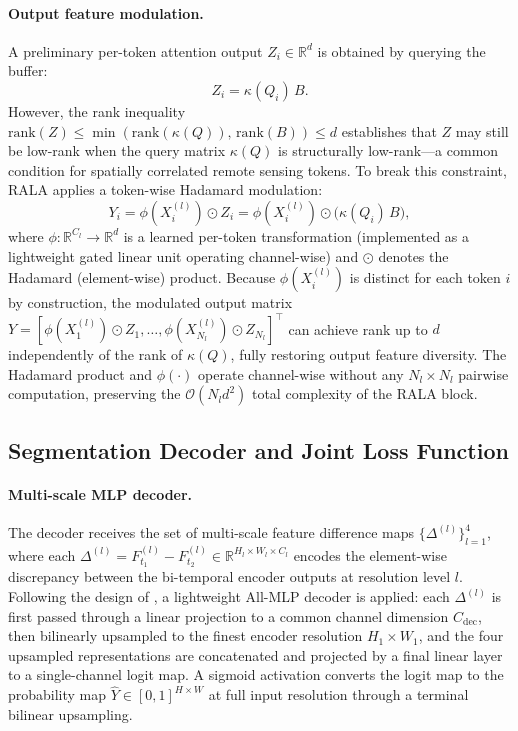 \paragraph{Output feature modulation.}
A preliminary per-token attention output $Z_i \in \mathbb{R}^d$ is obtained by
querying the buffer:
\begin{equation}
Z_i = \kappa(Q_i)\, B.
\label{eq:Z_pre_mod}
\end{equation}
However, the rank inequality $\mathrm{rank}(Z) \leq \min(\mathrm{rank}(\kappa(Q)),\,
\mathrm{rank}(B)) \leq d$ establishes that $Z$ may still be low-rank when the
query matrix $\kappa(Q)$ is structurally low-rank---a common condition for
spatially correlated remote sensing tokens. To break this constraint, RALA
applies a token-wise Hadamard modulation:
\begin{equation}
Y_i = \phi(X_i^{(l)}) \odot Z_i = \phi(X_i^{(l)}) \odot \bigl(\kappa(Q_i)\,B\bigr),
\label{eq:hadamard_mod}
\end{equation}
where $\phi: \mathbb{R}^{C_l} \to \mathbb{R}^d$ is a learned per-token
transformation (implemented as a lightweight gated linear unit operating
channel-wise) and $\odot$ denotes the Hadamard (element-wise) product.
Because $\phi(X_i^{(l)})$ is distinct for each token $i$ by construction,
the modulated output matrix
$Y = [\phi(X_1^{(l)}) \odot Z_1, \ldots, \phi(X_{N_l}^{(l)}) \odot Z_{N_l}]^\top$
can achieve rank up to $d$ independently of the rank of $\kappa(Q)$, fully
restoring output feature diversity. The Hadamard product and $\phi(\cdot)$
operate channel-wise without any $N_l \times N_l$ pairwise computation,
preserving the $\mathcal{O}(N_l d^2)$ total complexity of the RALA block.

\subsection{Segmentation Decoder and Joint Loss Function}
\label{subsec:decoder-loss}

\paragraph{Multi-scale MLP decoder.}
The decoder receives the set of multi-scale feature difference maps
$\{\Delta^{(l)}\}_{l=1}^{4}$, where each
$\Delta^{(l)} = F_{t_1}^{(l)} - F_{t_2}^{(l)} \in \mathbb{R}^{H_l \times W_l \times C_l}$
encodes the element-wise discrepancy between the bi-temporal encoder outputs
at resolution level $l$. Following the design of \cite{Bandara2022ChangeFormer},
a lightweight All-MLP decoder is applied: each $\Delta^{(l)}$ is first passed
through a linear projection to a common channel dimension $C_{\mathrm{dec}}$,
then bilinearly upsampled to the finest encoder resolution $H_1 \times W_1$,
and the four upsampled representations are concatenated and projected by a
final linear layer to a single-channel logit map. A sigmoid activation converts
the logit map to the probability map $\hat{Y} \in [0,1]^{H \times W}$ at full
input resolution through a terminal bilinear upsampling.

